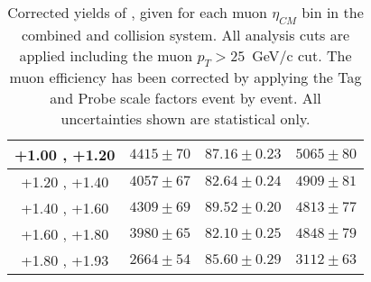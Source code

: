 \begin{table}[!h]
\begin{tabular}{|c|*3c|}
    \hline
    +1.00 , +1.20 & $4415 \pm 70$ & $87.16 \pm 0.23$ & $5065 \pm 80$\\
    \hline
    +1.20 , +1.40 & $4057 \pm 67$ & $82.64 \pm 0.24$ & $4909 \pm 81$\\
    \hline
    +1.40 , +1.60 & $4309 \pm 69$ & $89.52 \pm 0.20$ & $4813 \pm 77$\\
    \hline
    +1.60 , +1.80 & $3980 \pm 65$ & $82.10 \pm 0.25$ & $4848 \pm 79$\\
    \hline
    +1.80 , +1.93 & $2664 \pm 54$ & $85.60 \pm 0.29$ & $3112 \pm 63$\\
    \hline
  \end{tabular}
  \caption{Corrected yields of \WToMuNuPl, given for each muon $\eta_{CM}$ bin in the combined \pPb and \Pbp collision system. All analysis cuts are applied including the muon $p_{T} > 25$~GeV/c cut. The muon efficiency has been corrected by applying the Tag and Probe scale factors event by event. All uncertainties shown are statistical only.}
  \label{tab:CorrYields_WToMuPl_PA}
\end{table}


